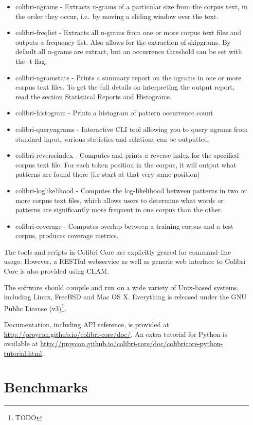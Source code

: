 \begin{itemize}
    \item colibri-ngrams - Extracts n-grams of a particular size from the
        corpus text, in the order they occur, i.e.\ by moving a sliding window over the text.
    \item colibri-freqlist - Extracts all n-grams from one or more corpus text files and outputs a frequency list. Also allows for the extraction of skipgrams. By default all n-grams are extract, but an occurrence threshold can be set with the -t flag.
    \item colibri-ngramstats - Prints a summary report on the ngrams in one or more corpus text files. To get the full details on interpreting the output report, read the section Statistical Reports and Histograms.
    \item colibri-histogram - Prints a histogram of pattern occurrence count
    \item colibri-queryngrams - Interactive CLI tool allowing you to query ngrams from standard input, various statistics and relations can be outputted.
    \item colibri-reverseindex - Computes and prints a reverse index for the specified corpus text file. For each token position in the corpus, it will output what patterns are found there (i.e start at that very same position)
    \item colibri-loglikelihood - Computes the log-likelihood between patterns in two or more corpus text files, which allows users to determine what words or patterns are significantly more frequent in one corpus than the other.
    \item colibri-coverage - Computes overlap between a training corpus and a test corpus, produces coverage metrics.
\end{itemize}

The tools and scripts in Colibri Core are explicitly geared for command-line
usage. However, a RESTful webservice as well as generic web interface to
Colibri Core is also provided using CLAM\cite{CLAM}.

The software should compile and run on a wide variety of Unix-based systems,
including Linux, FreeBSD and Mac OS X. Everything is released under the GNU
Public License (v3)\footnote{TODO}.

Documentation, including API reference, is provided at
\url{http://proycon.github.io/colibri-core/doc/}. An extra tutorial for Python
is available at
\url{http://proycon.github.io/colibri-core/doc/colibricore-python-tutorial.html}.

\section{Benchmarks}













